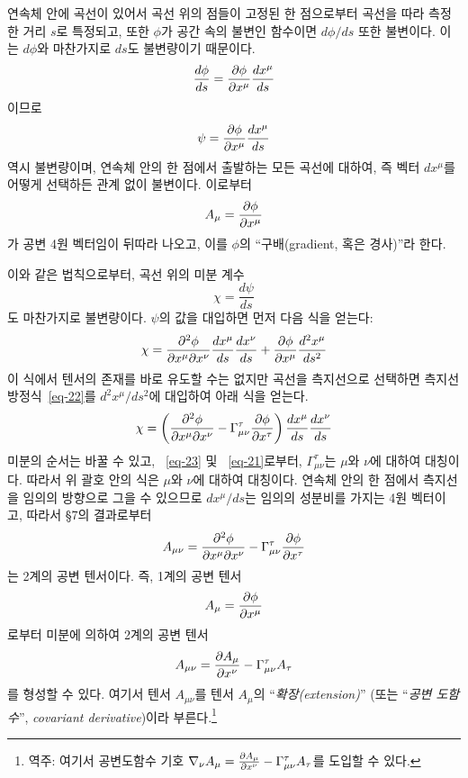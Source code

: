 \documentclass[b5paper]{article}
\begin{document}
연속체 안에 곡선이 있어서 곡선 위의 점들이 고정된 한 점으로부터 곡선을 따라 측정한 거리 $s$로 특정되고, 또한 $\phi$가 공간 속의 불변인 함수이면 $d\phi/ds$ 또한 불변이다. 이는 $d\phi$와 마찬가지로 $ds$도 불변량이기 때문이다.
\begin{equation*}
	\dfrac{d\phi}{ds}={\frac{{\partial}{\phi}}{{\partial}{x^\mu}}} \dfrac{dx^\mu}{ds}
\end{equation*} 
이므로
\begin{equation*}
	\psi={\frac{{\partial}{\phi}}{{\partial}{x^\mu}}} \dfrac{dx^\mu}{ds}
\end{equation*} 
역시 불변량이며, 연속체 안의 한 점에서 출발하는 모든 곡선에 대하여, 즉 벡터 $ dx^\mu $를 어떻게 선택하든 관계 없이 불변이다. 이로부터
\begin{equation} \label{eq-24}
	A_\mu={\frac{{\partial}{\phi}}{{\partial}{x^\mu}}}
\end{equation}
가 공변 4원 벡터임이 뒤따라 나오고, 이를 $\phi$의 ``구배(gradient, 혹은 경사)''라 한다.\par
이와 같은 법칙으로부터, 곡선 위의 미분 계수
\begin{equation*}
	\chi=\dfrac{d\psi}{ds}
\end{equation*}
도 마찬가지로 불변량이다. $\psi$의 값을 대입하면 먼저 다음 식을 얻는다:
\begin{equation*}
	\chi={\frac{{\partial^2}{\phi}}{{\partial}{x^\mu}{\partial}{x^\nu}}} \dfrac{dx^\mu}{ds} \dfrac{dx^\nu}{ds} 
	+ {\frac{{\partial}{\phi}}{{\partial}{x^\mu}}} \dfrac{d^2 x^\mu}{ds^2}
\end{equation*}
이 식에서 텐서의 존재를 바로 유도할 수는 없지만 곡선을 측지선으로 선택하면 측지선 방정식~\eqref{eq-22}를 $d^2 x^\mu / ds^2$에 대입하여 아래 식을 얻는다.
\begin{equation*}
	\chi=\left( {\frac{{\partial^2}{\phi}}{{\partial}{x^\mu}{\partial}{x^\nu}}}  
	            - \Gamma_{\mu\nu}^\tau {\frac{{\partial}{\phi}}{{\partial}{x^\tau}}} 
	     \right) \dfrac{dx^\mu}{ds} \dfrac{dx^\nu}{ds}
\end{equation*}
미분의 순서는 바꿀 수 있고, ~\eqref{eq-23} 및 ~\eqref{eq-21}로부터, $\Gamma_{\mu\nu}^\tau$는 \ind{} $\mu$와 $\nu$에 대하여 대칭이다. 따라서 위 괄호 안의 식은 $\mu$와 $\nu$에 대하여 대칭이다. 연속체 안의 한 점에서 측지선을 임의의 방향으로 그을 수 있으므로 $dx^\mu/ds$는 임의의 성분비를 가지는 4원 벡터이고, 따라서 \S 7의 결과로부터
\begin{equation} \label{eq-25}
	A_{\mu\nu} = {\frac{{\partial^2}{\phi}}{{\partial}{x^\mu}{\partial}{x^\nu}}}  
	- \Gamma_{\mu\nu}^\tau {\frac{{\partial}{\phi}}{{\partial}{x^\tau}}} 
\end{equation}
는 2계의 공변 텐서이다.
즉, 1계의 공변 텐서
\begin{equation*}
	A_\mu={\frac{{\partial}{\phi}}{{\partial}{x^\mu}}}
\end{equation*}
로부터 미분에 의하여 2계의 공변 텐서
\begin{equation} \label{eq-26}
A_{\mu\nu} = {\frac{{\partial}{A_\mu}}{{\partial}{x^\nu}}} 
- \Gamma_{\mu\nu}^\tau A_\tau
\end{equation}
를 형성할 수 있다. 여기서 텐서 $A_{\mu\nu}$를 텐서 $A_\mu$의 ``\emph{확장(extension)}'' (또는 ``\emph{공변 도함수}'', \emph{covariant derivative})이라 부른다.\footnote{역주: 여기서 공변도함수 기호 $\nabla_\nu A_\mu={\frac{{\partial}{A_\mu}}{{\partial}{x^\nu}}} - \Gamma_{\mu\nu}^\tau A_\tau$를 도입할 수 있다.}
\end{document}
